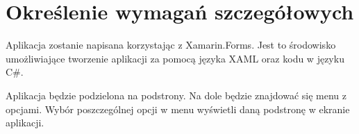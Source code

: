 \newpage
\section{Określenie wymagań szczegółowych}		%


\hspace{0.60cm}Aplikacja zostanie napisana korzystając z Xamarin.Forms. Jest to środowisko umożliwiające tworzenie aplikacji za pomocą języka XAML oraz kodu w języku C\#.

\hspace{0.60cm}Aplikacja będzie podzielona na podstrony. Na dole będzie znajdować się menu z opcjami. Wybór poszczególnej opcji w menu wyświetli daną podstronę w ekranie aplikacji.




